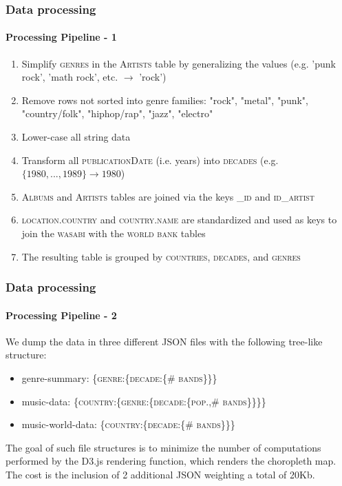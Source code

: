 \documentclass[aspectratio=43,10pt]{beamer}
\begin{document}
\begin{frame}
    \frametitle{Data processing}
    \framesubtitle{Processing Pipeline - 1}
    \small{
        \begin{enumerate}
            \item Simplify \textsc{genres} in the \textsc{Artists} table by generalizing the values (e.g. 'punk rock', 'math rock', etc. $\rightarrow$ 'rock')
            \item Remove rows not sorted into genre families: "rock", "metal", "punk", "country/folk", "hiphop/rap", "jazz", "electro"
            \item Lower-case all string data
            \item Transform all \textsc{publicationDate} (i.e. years) into \textsc{decades} (e.g. $\{1980, ..., 1989\} \rightarrow 1980$)
            \item \textsc{Albums} and \textsc{Artists} tables are joined via the keys \textsc{\_id} and \textsc{id\_artist}
            \item \textsc{location.country} and \textsc{country.name} are standardized and used as keys to join the \textsc{wasabi} with the \textsc{world bank} tables
            \item The resulting table is grouped by \textsc{countries}, \textsc{decades}, and \textsc{genres}
        \end{enumerate}
    }
\end{frame}

\begin{frame}
    \frametitle{Data processing}
    \framesubtitle{Processing Pipeline - 2}
    \small{
        We dump the data in three different JSON files with the following tree-like structure:
        \begin{itemize}
            \item genre-summary:\linebreak
            \scriptsize{\{\textsc{genre}:\{\textsc{decade}:\{\textsc{\# bands}\}\}\}}
            \item music-data:\linebreak
            \scriptsize{\{\textsc{country}:\{\textsc{genre}:\{\textsc{decade}:\{\textsc{pop.},\textsc{\# bands}\}\}\}\}}
            \item music-world-data:\linebreak
            \scriptsize{\{\textsc{country}:\{\textsc{decade}:\{\textsc{\# bands}\}\}\}}
        \end{itemize}
    The goal of such file structures is to minimize the number of computations performed by the D3.js rendering function, which renders the choropleth map. The cost is the inclusion of 2 additional JSON weighting a total of 20Kb. 
    }
\end{frame}
\end{document}
